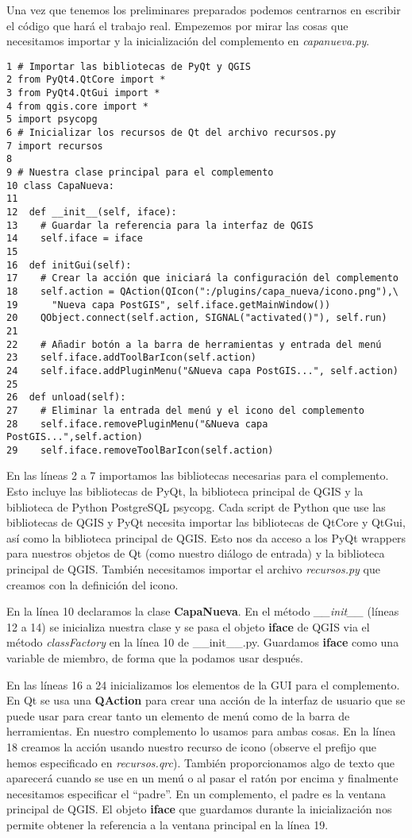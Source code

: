 Una vez que tenemos los preliminares preparados podemos centrarnos en escribir el código que hará el trabajo real. 
Empezemos por mirar las cosas que necesitamos importar y la inicialización del complemento en \textsl{capanueva.py}.
 
\begin{verbatim}
1 # Importar las bibliotecas de PyQt y QGIS
2 from PyQt4.QtCore import *
3 from PyQt4.QtGui import *
4 from qgis.core import *
5 import psycopg
6 # Inicializar los recursos de Qt del archivo recursos.py
7 import recursos
8
9 # Nuestra clase principal para el complemento
10 class CapaNueva:
11
12  def __init__(self, iface):
13    # Guardar la referencia para la interfaz de QGIS
14    self.iface = iface
15
16  def initGui(self):
17    # Crear la acción que iniciará la configuración del complemento
18    self.action = QAction(QIcon(":/plugins/capa_nueva/icono.png"),\
19      "Nueva capa PostGIS", self.iface.getMainWindow())
20    QObject.connect(self.action, SIGNAL("activated()"), self.run)
21
22    # Añadir botón a la barra de herramientas y entrada del menú
23    self.iface.addToolBarIcon(self.action)
24    self.iface.addPluginMenu("&Nueva capa PostGIS...", self.action)
25
26  def unload(self):
27    # Eliminar la entrada del menú y el icono del complemento
28    self.iface.removePluginMenu("&Nueva capa PostGIS...",self.action)
29    self.iface.removeToolBarIcon(self.action)
\end{verbatim}

En las líneas 2 a 7 importamos las bibliotecas necesarias para el complemento. Esto incluye las bibliotecas 
de PyQt, la biblioteca principal de QGIS y la biblioteca de Python 
PostgreSQL psycopg. 
Cada script de Python que use las bibliotecas de QGIS y PyQt necesita importar las bibliotecas de QtCore 
y QtGui, así como la biblioteca principal de QGIS. Esto nos da acceso a los PyQt wrappers para nuestros 
objetos de Qt (como nuestro diálogo de entrada) y la biblioteca principal de QGIS. 
También necesitamos importar el archivo \textsl{recursos.py} que creamos con la definición del icono.

En la línea 10 declaramos la clase \textbf{CapaNueva}. En el método \textsl{\_\_init\_\_} 
(líneas 12 a 14) se inicializa nuestra clase y se pasa el objeto \textbf{iface} de QGIS via el método 
\textsl{classFactory} en la línea 10 de \_\_init\_\_.py. Guardamos \textbf{iface} como 
una variable de miembro, de forma que la podamos usar después.

En las líneas 16 a 24 inicializamos los elementos de la GUI para el complemento. En Qt se usa una 
\textbf{QAction} para crear una acción de la interfaz de usuario que se puede usar para crear tanto 
un elemento de menú como de la barra de herramientas. En nuestro complemento lo usamos para ambas cosas. 
En la línea 18 creamos la acción usando nuestro recurso de icono (observe el prefijo que hemos especificado 
en \textsl{recursos.qrc}). También proporcionamos algo de texto que aparecerá cuando se use en un menú o al 
pasar el ratón por encima y finalmente necesitamos especificar el ``padre''. En un complemento, el padre es 
la ventana principal de QGIS. El objeto \textbf{iface} que guardamos durante la inicialización nos permite 
obtener la referencia a la ventana principal en la línea 19.

